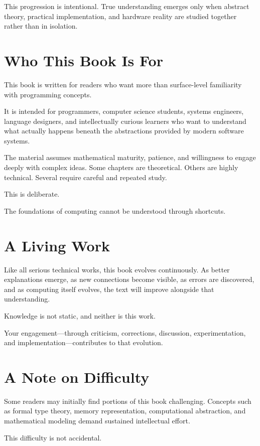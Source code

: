 This progression is intentional. True understanding emerges only when abstract theory, practical implementation, and hardware reality are studied together rather than in isolation.

\section*{Who This Book Is For}

This book is written for readers who want more than surface-level familiarity with programming concepts.

It is intended for programmers, computer science students, systems engineers, language designers, and intellectually curious learners who want to understand what actually happens beneath the abstractions provided by modern software systems.

The material assumes mathematical maturity, patience, and willingness to engage deeply with complex ideas. Some chapters are theoretical. Others are highly technical. Several require careful and repeated study.

This is deliberate.

The foundations of computing cannot be understood through shortcuts.

\section*{A Living Work}

Like all serious technical works, this book evolves continuously. As better explanations emerge, as new connections become visible, as errors are discovered, and as computing itself evolves, the text will improve alongside that understanding.

Knowledge is not static, and neither is this work.

Your engagement—through criticism, corrections, discussion, experimentation, and implementation—contributes to that evolution.

\section*{A Note on Difficulty}

Some readers may initially find portions of this book challenging. Concepts such as formal type theory, memory representation, computational abstraction, and mathematical modeling demand sustained intellectual effort.

This difficulty is not accidental.

